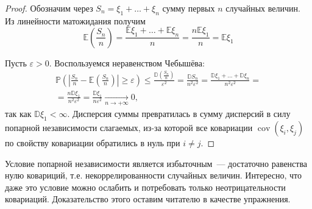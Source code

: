 \begin{proof}
    Обозначим через $S_n = \xi_1 + \ldots + \xi_n$ сумму первых $n$ случайных величин. Из линейности матожидания получим
    \begin{equation*}
        \mathbb{E}\left(\frac{S_{n}}{n}\right)=\frac{\mathbb{E} \xi_{1}+\ldots+\mathbb{E} \xi_{n}}{n}=\frac{n \mathbb{E} \xi_{1}}{n}=\mathbb{E} \xi_{1}
    \end{equation*}
    
    Пусть $\varepsilon > 0.$ Воспользуемся неравенством Чебышёва:
    \begin{multline*}
        \mathbb{P}\left(\left|\frac{S_{n}}{n}-\mathbb{E}\left(\frac{S_{n}}{n}\right)\right| \geqslant \varepsilon\right) \leqslant \frac{\mathbb{D}\left(\frac{S_{n}}{n}\right)}{\varepsilon^{2}}
        = \frac{\mathbb{D} S_{n}}{n^{2} \varepsilon^{2}}
        = \frac{\mathbb{D} \xi_{1}+\ldots+\mathbb{D} \xi_{n}}{n^{2} \varepsilon^{2}}= \\
        = \frac{n \mathbb{D} \xi_{1}}{n^{2} \varepsilon^{2}}
        = \frac{\mathbb{D} \xi_{1}}{n \varepsilon^{2}} \xrightarrow[n \to +\infty]{} 0,
    \end{multline*}
    так как $\mathbb{D}\xi_1 < \infty$. Дисперсия суммы превратилась в сумму дисперсий в силу попарной независимости слагаемых, из-за которой все ковариации $\operatorname{cov}(\xi_i, \xi_j)$ по свойству ковариации обратились в нуль при $i \neq j$.
\end{proof}

\begin{rmrk}
    Условие попарной независимости является избыточным~--- достаточно равенства нулю ковариций, т.е. некоррелированности случайных величин.
    Интересно, что даже это условие можно ослабить и потребовать только неотрицательности ковариаций.
    Доказательство этого оставим читателю в качестве упражнения. 
\end{rmrk}